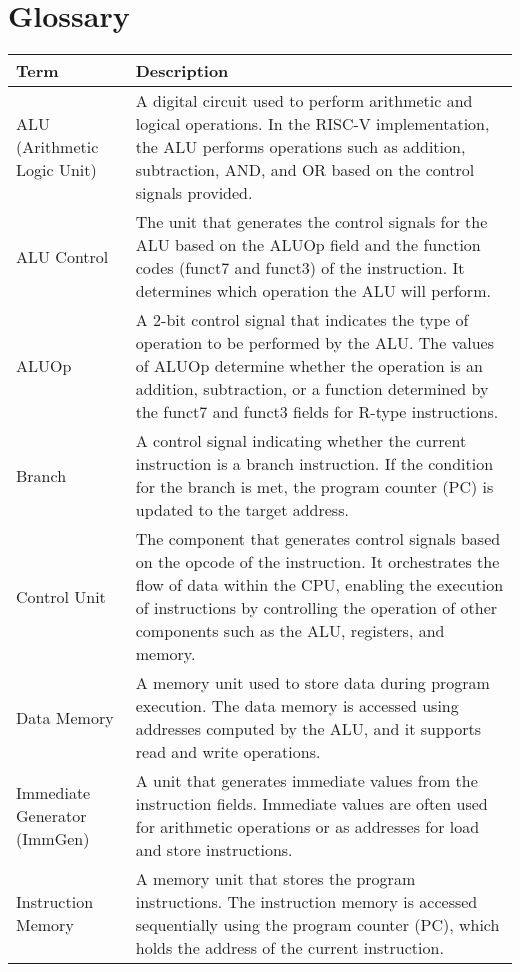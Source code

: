 \newpage
{}
\section{Glossary}
\begin{table}[H]
    \centering
    \begin{tabularx}{\textwidth}{|p{3cm}|X|}
        \hline
        \textbf{Term} & \textbf{Description} \\
        \hline\hline
        ALU (Arithmetic Logic Unit) & A digital circuit used to perform arithmetic and logical operations. In the RISC-V implementation, the ALU performs operations such as addition, subtraction, AND, and OR based on the control signals provided. \\
        \hline
        ALU Control & The unit that generates the control signals for the ALU based on the ALUOp field and the function codes (funct7 and funct3) of the instruction. It determines which operation the ALU will perform. \\
        \hline
        ALUOp & A 2-bit control signal that indicates the type of operation to be performed by the ALU. The values of ALUOp determine whether the operation is an addition, subtraction, or a function determined by the funct7 and funct3 fields for R-type instructions. \\
        \hline
        Branch & A control signal indicating whether the current instruction is a branch instruction. If the condition for the branch is met, the program counter (PC) is updated to the target address. \\
        \hline
        Control Unit & The component that generates control signals based on the opcode of the instruction. It orchestrates the flow of data within the CPU, enabling the execution of instructions by controlling the operation of other components such as the ALU, registers, and memory. \\
        \hline
        Data Memory & A memory unit used to store data during program execution. The data memory is accessed using addresses computed by the ALU, and it supports read and write operations. \\
        \hline
        Immediate Generator (ImmGen) & A unit that generates immediate values from the instruction fields. Immediate values are often used for arithmetic operations or as addresses for load and store instructions. \\
        \hline
        Instruction Memory & A memory unit that stores the program instructions. The instruction memory is accessed sequentially using the program counter (PC), which holds the address of the current instruction. \\

\end{tabularx}
\end{table}
